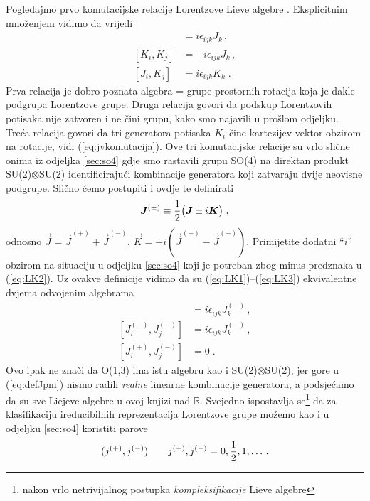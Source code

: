 Pogledajmo prvo komutacijske relacije Lorentzove Lieve algebre . Eksplicitnim
množenjem vidimo da vrijedi
\begin{align}
[J_i, J_j] &= i\epsilon_{ijk} J_k  \,, \label{eq:LK1}\\
[K_i, K_j] &= -i\epsilon_{ijk} J_k \,, \label{eq:LK2} \\
[J_i, K_j] &= i\epsilon_{ijk} K_k \;. \label{eq:LK3}
\end{align}
Prva relacija je dobro poznata algebra = grupe prostornih rotacija
koja je dakle podgrupa Lorentzove grupe.
Druga relacija govori da podskup Lorentzovih potisaka nije zatvoren
i ne čini grupu, kako smo najavili u prošlom odjeljku. Treća
relacija govori da tri generatora potisaka $K_i$ čine kartezijev vektor obzirom
na rotacije, vidi (\ref{eq:jvkomutacija}).
Ove tri komutacijske relacije su vrlo slične onima iz odjeljka \ref{sec:so4} gdje smo 
rastavili grupu SO(4) na direktan produkt SU(2)$\otimes$SU(2) identificirajući
kombinacije generatora koji zatvaraju dvije neovisne podgrupe.
Slično ćemo postupiti i ovdje te definirati
\begin{equation}
  \vec{J}^{(\pm)} \equiv \fhalf \big(\vec{J}\pm i \vec{K} \big) \;,
  \label{eq:defJpm}
\end{equation}
odnosno $\vec{J}=\vec{J}^{(+)}+\vec{J}^{(-)}$, $\vec{K} = -i
(\vec{J}^{(+)}-\vec{J}^{(-)})$. Primijetite dodatni ``$i$'' obzirom
na situaciju u odjeljku \ref{sec:so4} koji je potreban zbog
minus predznaka u (\ref{eq:LK2}).
Uz ovakve definicije vidimo da su (\ref{eq:LK1})--(\ref{eq:LK3}) ekvivalentne
dvjema odvojenim  algebrama
\begin{align}
[J_{i}^{(+)}, J_{j}^{(+)}] &= i \epsilon_{ijk} J_{k}^{(+)} \,, \\
[J_{i}^{(-)}, J_{j}^{(-)}] &= i \epsilon_{ijk} J_{k}^{(-)} \,, \\
[J_{i}^{(+)}, J_{j}^{(-)}] &= 0  \;.
\end{align}
Ovo ipak ne znači  da O(1,3) ima istu algebru kao i SU(2)$\otimes$SU(2),
jer gore u (\ref{eq:defJpm})  nismo radili \emph{realne} linearne kombinacije generatora,
a podsjećamo da su sve Liejeve algebre u ovoj knjizi nad $\mathbb{R}$.
Svejedno ispostavlja se\footnote{nakon vrlo netrivijalnog postupka \emph{kompleksifikacije}
Lieve algebre} da za klasifikaciju ireducibilnih reprezentacija Lorentzove
grupe možemo kao i u odjeljku \ref{sec:so4} koristiti parove
\begin{equation}
(j^{(+)}, j^{(-)})  \qquad j^{(+)}, j^{(-)} = 0, \frac{1}{2}, 1, \dotsc .
\end{equation}
